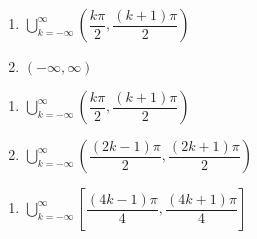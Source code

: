 \documentclass{ximera}
\begin{document}
\begin{multicols}{2}

\begin{enumerate}

\setcounter{enumi}{\value{HW}}

\item $\displaystyle \bigcup_{k=-\infty}^{\infty} \left( \dfrac{k\pi}{2}, \dfrac{(k+1)\pi}{2} \right)$
\item $(-\infty, \infty)$ 

\setcounter{HW}{\value{enumi}}

\end{enumerate}

\end{multicols}

\begin{multicols}{2}

\begin{enumerate}

\setcounter{enumi}{\value{HW}}

\item $\displaystyle \bigcup_{k=-\infty}^{\infty} \left( \dfrac{k\pi}{2}, \dfrac{(k+1)\pi}{2} \right)$
\item $\displaystyle \bigcup_{k=-\infty}^{\infty} \left( \dfrac{(2k - 1)\pi}{2}, \dfrac{(2k+1)\pi}{2} \right)$

\setcounter{HW}{\value{enumi}}

\end{enumerate}

\end{multicols}

\begin{enumerate}

\setcounter{enumi}{\value{HW}}

\item $\displaystyle \bigcup_{k=-\infty}^{\infty} \left[ \dfrac{(4k - 1)\pi}{4}, \dfrac{(4k+1)\pi}{4} \right]$

\setcounter{HW}{\value{enumi}}

\end{enumerate}
\end{document}
